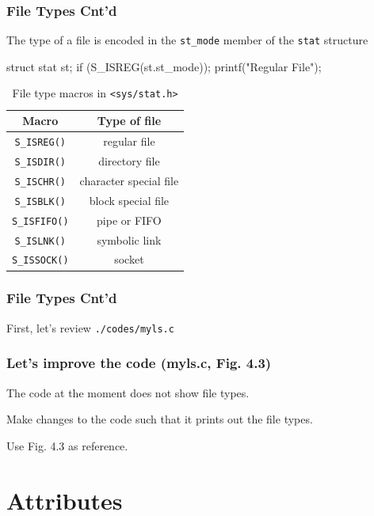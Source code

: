 \documentclass[newPxFont,sthlmFooter,nooffset]{beamer}
\begin{document}
\begin{frame}[containsverbatim,t]
  \frametitle{File Types Cnt'd}
The type of a file is encoded in the \texttt{st\_mode} member of the \texttt{stat} structure

\begin{codedef}
struct stat st; 
if (S_ISREG(st.st_mode));
    printf("Regular File\n");
\end{codedef}


\begin{center}
  \begin{table}
    \centering
    \begin{tabular}[t]{c | c}
    Macro & Type of file \\ \hline
    \texttt{S\_ISREG()}	&	regular file	\\  \hline
    \texttt{S\_ISDIR()}	&	directory file	\\  \hline
    \texttt{S\_ISCHR()}	&	character special file	\\  \hline
    \texttt{S\_ISBLK()}	&	block special file	\\  \hline
    \texttt{S\_ISFIFO()}	&	pipe or FIFO	\\  \hline
    \texttt{S\_ISLNK()}	&	symbolic link	\\  \hline
    \texttt{S\_ISSOCK()}	&	socket 	\\  
  \end{tabular}
  \caption{File type macros in \texttt{<sys/stat.h>}}
\end{table}

\end{center}

\end{frame}

\begin{frame}[containsverbatim,t]
  \frametitle{File Types Cnt'd}
First, let's review \texttt{./codes/myls.c}
  
\end{frame}

\begin{frame}[t]
  \frametitle{Let's improve the code (myls.c, Fig. 4.3)}
The code at the moment does not show file types. 

Make changes to the code such that it prints out the file types. 

Use Fig. 4.3 as reference.
  
\end{frame}

\section{Attributes}
\end{document}
